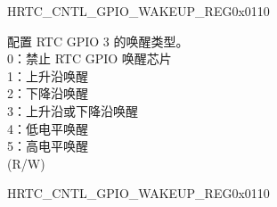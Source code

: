 \begin{register}{H}{RTC\_CNTL\_GPIO\_WAKEUP\_REG}{0x0110}
\begin{regdesc}
\begin{reglist}
\label{fielddesc:RTCCNTLGPIOPIN3INTTYPE}\item [RTC\_CNTL\_GPIO\_PIN3\_INT\_TYPE] 配置 RTC GPIO 3 的唤醒类型。\\
0：禁止 RTC GPIO 唤醒芯片\\
1：上升沿唤醒\\
2：下降沿唤醒\\
3：上升沿或下降沿唤醒\\
4：低电平唤醒\\
5：高电平唤醒\\
(R/W)


\item [见下页...]
\end{reglist}\end{regdesc}
\end{register}
\addtocounter{Regfloat}{-1}
\begin{register}{H}{RTC\_CNTL\_GPIO\_WAKEUP\_REG}{0x0110}
\begin{regdesc}\begin{reglist}
\item [接上页...]


\end{reglist}
\end{regdesc}
\end{register}
